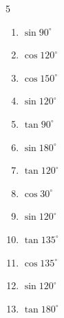 \begin{multicols}{5}
\begin{enumerate}
  \item $\displaystyle \sin{90^\circ}$

        \phantom{$\displaystyle =1$}

  \item $\displaystyle \cos{120^\circ}$


  \item $\displaystyle \cos{150^\circ}$


  \item $\displaystyle \sin{120^\circ}$


\columnbreak %

  \item $\displaystyle \tan{90^\circ}$

        \phantom{$\displaystyle なし$}

  \item $\displaystyle \sin{180^\circ}$

        \phantom{$\displaystyle =0$}

  \item $\displaystyle \tan{120^\circ}$


  \item $\displaystyle \cos{30^\circ}$


  \item $\displaystyle \sin{120^\circ}$


  \item $\displaystyle \tan{135^\circ}$

        \phantom{$\displaystyle =-1$}

  \item $\displaystyle \cos{135^\circ}$


  \item $\displaystyle \sin{120^\circ}$


  \item $\displaystyle \tan{180^\circ}$


\end{enumerate}
\end{multicols}
